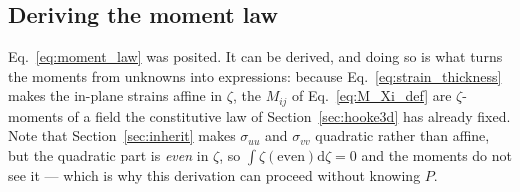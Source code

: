 \documentclass[11pt]{article}
\begin{document}
\subsection{Deriving the moment law}\label{sec:moment_derive}
Eq.~\eqref{eq:moment_law} was posited. It can be derived, and doing so is what
turns the moments from unknowns into expressions: because
Eq.~\eqref{eq:strain_thickness} makes the in-plane strains affine in $\zeta$, the
$M_{ij}$ of Eq.~\eqref{eq:M_Xi_def} are $\zeta$-moments of a field the
constitutive law of Section~\ref{sec:hooke3d} has already fixed. Note that
Section~\ref{sec:inherit} makes $\sigma_{uu}$ and $\sigma_{vv}$ quadratic rather
than affine, but the quadratic part is \emph{even} in $\zeta$, so
$\int\zeta\left(\text{even}\right)\mathrm d\zeta = 0$ and the moments do not see
it --- which is why this derivation can proceed without knowing $P$.
\end{document}
